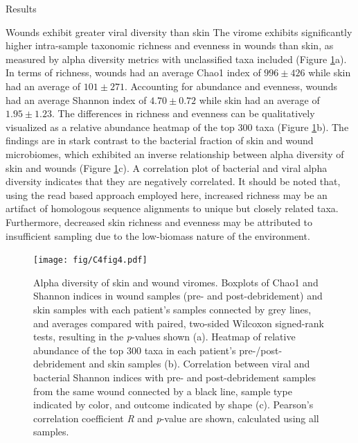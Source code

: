 \documentclass[oneside,12pt,final]{sty/ucthesis-CA2012}
\begin{document}
\begin{mainmatter}
\begin{section}{Results}
\begin{subsection}{Wounds exhibit greater viral diversity than skin}
The virome exhibits significantly higher intra-sample taxonomic richness and evenness in wounds than skin, as measured by alpha diversity metrics with unclassified taxa included (Figure \ref{fig:C4F4}a). In terms of richness, wounds had an average Chao1 index of $996 \pm 426$ while skin had an average of $101 \pm 271$. Accounting for abundance and evenness, wounds had an average Shannon index of $4.70 \pm 0.72$ while skin had an average of $1.95 \pm 1.23$. The differences in richness and evenness can be qualitatively visualized as a relative abundance heatmap of the top 300 taxa (Figure \ref{fig:C4F4}b). The findings are in stark contrast to the bacterial fraction of skin and wound microbiomes, which exhibited an inverse relationship between alpha diversity of skin and wounds (Figure \ref{fig:C4F4}c). A correlation plot of bacterial and viral alpha diversity indicates that they are negatively correlated. It should be noted that, using the read based approach employed here, increased richness may be an artifact of homologous sequence alignments to unique but closely related taxa. Furthermore, decreased skin richness and evenness may be attributed to insufficient sampling due to the low-biomass nature of the environment.

\begin{figure}
\centering
\centerline{\texttt{[image: fig/C4fig4.pdf]}}
\caption{Alpha diversity of skin and wound viromes. Boxplots of Chao1 and Shannon indices in wound samples (pre- and post-debridement) and skin samples with each patient's samples connected by grey lines, and averages compared with paired, two-sided Wilcoxon signed-rank tests, resulting in the \textit{p}-values shown (a). Heatmap of relative abundance of the top $300$ taxa in each patient's pre-/post-debridement and skin samples (b). Correlation between viral and bacterial Shannon indices with pre- and post-debridement samples from the same wound connected by a black line, sample type indicated by color, and outcome indicated by shape (c). Pearson's correlation coefficient \textit{R} and \textit{p}-value are shown, calculated using all samples.}
\label{fig:C4F4}
\end{figure}
\end{subsection}


\end{section}
\end{mainmatter}
\end{document}
